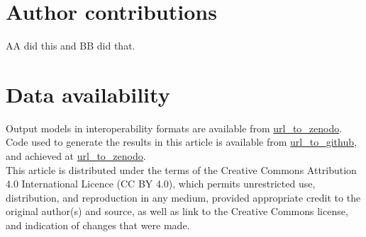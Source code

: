 \documentclass{tektonika}
\begin{document}
\section*{Author contributions} %
AA did this and BB did that. 

\section*{Data availability}
Output models in interoperability formats are available from \url{url_to_zenodo}. Code used to generate the results in this article is available from \url{url_to_github}, and achieved at \url{url_to_zenodo}. \\


This article is distributed under the terms of the Creative Commons Attribution 4.0 International Licence (CC BY 4.0), which permits unrestricted use, distribution, and reproduction in any medium, provided appropriate credit to the original author(s) and source, as well as link to the Creative Commons license, and indication of changes that were made.



\end{document}
